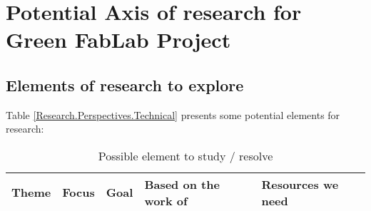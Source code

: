 \chapter{Potential Axis of research for Green FabLab Project}


\section{Elements of research to explore}

\begin{small}
	
	Table \ref{Research.Perspectives.Technical} presents some potential elements	for research:
	
	
	\begin{longtabu} to \linewidth [H] { X[0.5,l]  X[0.5,l]  X[1.4, l]  X[0.5, l]   X[1,l]   }
		
		\caption{Possible element to study / resolve} \\
		
		\toprule
		\textbf{Theme}	& \textbf{Focus} & \textbf{Goal} & \textbf{Based on the work of} & \textbf{Resources we need}  \\ 		
		\midrule
		\endfirsthead
		
		
		

\end{longtabu}
\end{small}
